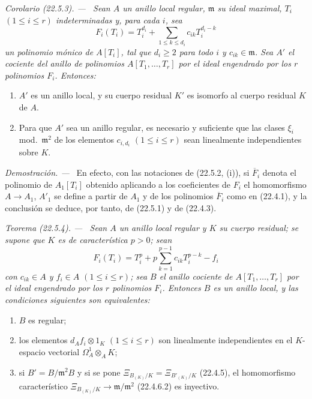 \documentclass[10pt,oneside]{book}
\makeatletter
\newcommand{\setmanualcurrentlabel}[1]{\def\@currentlabel{#1}}
\newenvironment{theorem}[1][]{%
  \setmanualcurrentlabel{#1}\par\medskip\noindent\itshape Teorema (#1). ---\ }{\par}
\newenvironment{corollary}[1][]{%
  \setmanualcurrentlabel{#1}\par\medskip\noindent\itshape Corolario (#1). ---\ }{\par}
\newenvironment{proof}{%
  \par\medskip\noindent\textit{Demostración. ---\ }}{\par}
\providecommand{\setmin}{-}%
\makeatother
\begin{document}
\begin{corollary}[22.5.3]
\label{0.22.5.3-es}
Sean $A$ un anillo local regular, $\mathfrak m$ su ideal maximal,
$T_i$ $(1\leqslant i\leqslant r)$ indeterminadas y, para cada $i$, sea
\begin{equation}
\label{0.22.5.3.1-es}
  F_i(T_i)=T_i^{d_i}+\sum_{1\leqslant k\leqslant d_i}c_{ik}T_i^{d_i-k}
  \tag{22.5.3.1}
\end{equation}
un polinomio mónico de $A[T_i]$, tal que $d_i\geqslant2$ para todo $i$ y
$c_{ik}\in\mathfrak m$. Sea $A'$ el cociente del anillo de polinomios
$A[T_1,\ldots,T_r]$ por el ideal engendrado por los $r$ polinomios $F_i$. Entonces:
\begin{enumerate}
  \item[\rm(i)] $A'$ es un anillo local, y su cuerpo residual $K'$ es
  isomorfo al cuerpo residual $K$ de $A$.
  \item[\rm(ii)] Para que $A'$ sea un anillo regular, es necesario y suficiente
  que las clases $\xi_i$ \textup{mod.}~$\mathfrak m^2$ de los elementos $c_{i,d_i}$
  $(1\leqslant i\leqslant r)$ sean linealmente independientes sobre $K$.
\end{enumerate}
\end{corollary}

\begin{proof}
En efecto, con las notaciones de (22.5.2, (i)), si $\overline F_i$ denota el
polinomio de $A_1[T_i]$ obtenido aplicando a los coeficientes de $F_i$
el homomorfismo $A\longrightarrow A_1$, $A'_1$ se define a partir de $A_1$ y
de los polinomios $\overline F_i$ como en (22.4.1), y la conclusión se deduce,
por tanto, de (22.5.1) y de (22.4.3).
\end{proof}

\begin{theorem}[22.5.4]
\label{0.22.5.4-es}
Sean $A$ un anillo local regular y $K$ su cuerpo residual; se supone que
$K$ es de característica $p>0$; sean
\begin{equation}
\label{0.22.5.4.1-es}
  F_i(T_i)=T_i^p+p\sum_{k=1}^{p-1}c_{ik}T_i^{p-k}\setmin f_i
  \tag{22.5.4.1}
\end{equation}
con $c_{ik}\in A$ y $f_i\in A$ $(1\leqslant i\leqslant r)$; sea $B$
el anillo cociente de $A[T_1,\ldots,T_r]$ por el ideal engendrado por los $r$
polinomios $F_i$. Entonces $B$ es un anillo local, y las condiciones siguientes
son equivalentes:
\begin{enumerate}
  \item[\textup{a)}] $B$ es regular;
  \item[\textup{b)}] los elementos $d_Af_i\otimes1_K$ $(1\leqslant i\leqslant r)$ son
  linealmente independientes en el $K$-espacio vectorial
  $\Omega^1_A\otimes_AK$;
  \item[\textup{c)}] si $B'=B/\mathfrak m^2B$ y si se pone
  $\Xi_{B_{(K)}/K}=\Xi_{B'_{(K)}/K}$ \textup{(22.4.5)}, el homomorfismo
  característico $\Xi_{B_{(K)}/K}\longrightarrow\mathfrak m/\mathfrak m^2$
  \textup{(22.4.6.2)} es inyectivo.
\end{enumerate}
\end{theorem}
\end{document}
